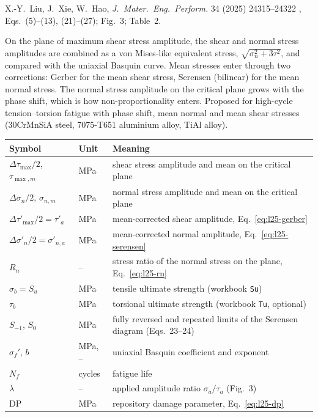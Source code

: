 \label{sheet:LIU2025}

 X.-Y.~Liu, J.~Xie, W.~Hao, \emph{J.\ Mater.\ Eng.\ Perform.} 34 (2025) 24315--24322
\cite{liu2025}, Eqs.~(5)--(13), (21)--(27); Fig.~3; Table~2.

 On the plane of maximum shear stress amplitude, the shear and normal stress
amplitudes are combined as a von Mises-like equivalent stress, $\sqrt{\sigma_n^2+3\tau^2}$, and compared
with the uniaxial Basquin curve. Mean stresses enter through two corrections: Gerber for the mean shear
stress, Serensen (bilinear) for the mean normal stress. The normal stress amplitude on the critical
plane grows with the phase shift, which is how non-proportionality enters. Proposed for high-cycle
tension--torsion fatigue with phase shift, mean normal and mean shear stresses (30CrMnSiA steel,
7075-T651 aluminium alloy, TiAl alloy).

\begin{center}\small
\begin{tabular}{@{}llp{100mm}@{}}
\toprule
Symbol & Unit & Meaning\\\midrule
$\Delta\tau_{\max}/2$, $\tau_{\max,m}$ & MPa & shear stress amplitude and mean on the critical plane\\
$\Delta\sigma_n/2$, $\sigma_{n,m}$ & MPa & normal stress amplitude and mean on the critical plane\\
$\Delta\tau'_{\max}/2=\tau'_a$ & MPa & mean-corrected shear amplitude, Eq.~\eqref{eq:l25-gerber}\\
$\Delta\sigma'_n/2=\sigma'_{n,a}$ & MPa & mean-corrected normal amplitude, Eq.~\eqref{eq:l25-serensen}\\
$R_n$ & -- & stress ratio of the normal stress on the plane, Eq.~\eqref{eq:l25-rn}\\
$\sigma_b=S_u$ & MPa & tensile ultimate strength (workbook \texttt{Su})\\
$\tau_b$ & MPa & torsional ultimate strength (workbook \texttt{Tu}, optional)\\
$S_{-1}$, $S_0$ & MPa & fully reversed and repeated limits of the Serensen diagram (Eqs.~23--24)\\
$\sigma_f'$, $b$ & MPa, -- & uniaxial Basquin coefficient and exponent\\
$N_f$ & cycles & fatigue life\\
$\lambda$ & -- & applied amplitude ratio $\sigma_a/\tau_a$ (Fig.~3)\\
$\mathrm{DP}$ & MPa & repository damage parameter, Eq.~\eqref{eq:l25-dp}\\
\bottomrule
\end{tabular}
\end{center}


